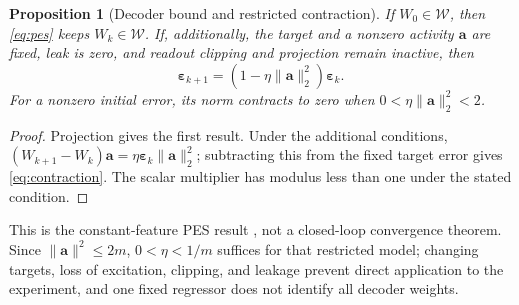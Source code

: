 \documentclass[letterpaper, 10 pt, conference]{ieeeconf}
\newtheorem{proposition}{Proposition}
\newtheorem{remark}{Remark}
\begin{document}
\begin{proposition}[Decoder bound and restricted contraction]
\label{prop:pes}
If $W_0\in\mathcal W$, then \eqref{eq:pes} keeps $W_k\in\mathcal W$.
If, additionally, the target and a nonzero activity $\bm a$ are fixed,
leak is zero, and readout clipping and projection remain inactive, then
\begin{equation}
 \bm\varepsilon_{k+1}
       =(1-\eta\|\bm a\|_2^2)\bm\varepsilon_k.
 \label{eq:contraction}
\end{equation}
For a nonzero initial error, its norm contracts to zero when
$0<\eta\|\bm a\|_2^2<2$.
\end{proposition}
\begin{proof}
Projection gives the first result. Under the additional conditions,
$(W_{k+1}-W_k)\bm a=\eta\bm\varepsilon_k\|\bm a\|_2^2$;
subtracting this from the fixed target error gives
\eqref{eq:contraction}. The scalar multiplier has modulus less than one
under the stated condition.
\end{proof}
This is the constant-feature PES result \cite{voelker2015pes}, not a
closed-loop convergence theorem. Since $\|\bm a\|^2\le2m$, $0<\eta<1/m$
suffices for that restricted model; changing targets, loss of excitation,
clipping, and leakage prevent direct application to the experiment, and
one fixed regressor does not identify all decoder weights.

\end{document}
